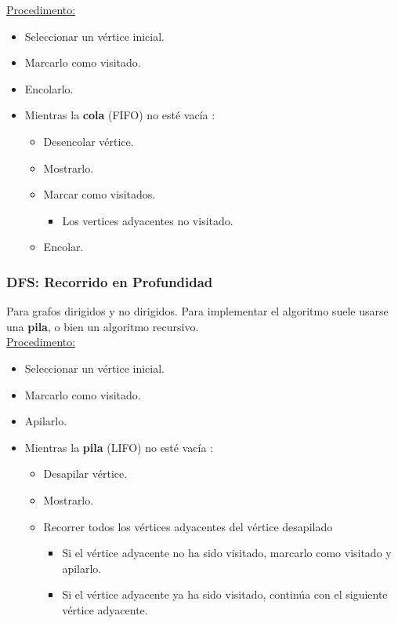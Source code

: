 \documentclass[../main.tex]{subfiles}
\begin{document}
            \underline{Procedimento:}
            \begin{itemize}
                \item Seleccionar un vértice inicial.
                \item Marcarlo como visitado.
                \item Encolarlo.
                \item Mientras la \textbf{cola} (FIFO) no esté vacía :
                    \begin{itemize}
                        \item Desencolar vértice.
                        \item Mostrarlo.
                        \item Marcar como visitados.
                            \begin{itemize}
                                \item Los vertices adyacentes no visitado.
                            \end{itemize}
                            \item Encolar.
                    \end{itemize}

            \end{itemize}

        \subsubsection{DFS: Recorrido en Profundidad}
            Para grafos dirigidos y no dirigidos. Para implementar el algoritmo suele usarse una \textbf{pila}, o bien un algoritmo recursivo.\\
            
            \underline{Procedimento:}
            \begin{itemize}
                \item Seleccionar un vértice inicial.
                \item Marcarlo como visitado.
                \item Apilarlo.
                \item Mientras la \textbf{pila} (LIFO) no esté vacía :
                    \begin{itemize}
                        \item Desapilar vértice.
                        \item Mostrarlo.
                        \item Recorrer todos los vértices adyacentes del vértice desapilado
                            \begin{itemize}
                                \item Si el vértice adyacente no ha sido visitado, marcarlo como visitado y apilarlo.
                                \item Si el vértice adyacente ya ha sido visitado, continúa con el siguiente vértice adyacente.
                            \end{itemize}
                    \end{itemize}
            \end{itemize}
\end{document}
